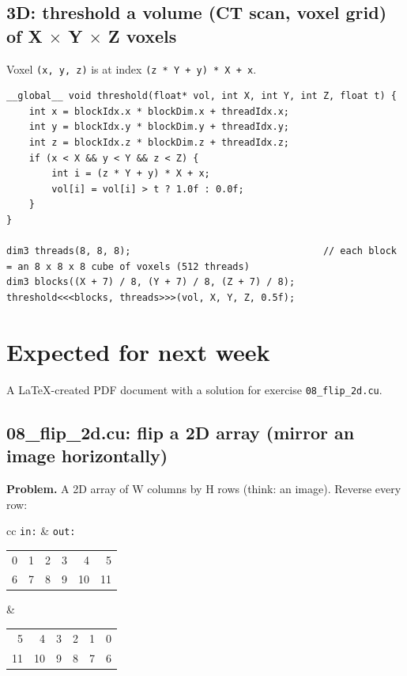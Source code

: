 \documentclass[main.tex]{subfiles}
\begin{document}
\subsection{3D: threshold a volume (CT scan, voxel grid) of X $\times$ Y $\times$ Z voxels}
Voxel \texttt{(x, y, z)} is at index \texttt{(z * Y + y) * X + x}.
\begin{lstlisting}[language=CUDA]
__global__ void threshold(float* vol, int X, int Y, int Z, float t) {
    int x = blockIdx.x * blockDim.x + threadIdx.x;
    int y = blockIdx.y * blockDim.y + threadIdx.y;
    int z = blockIdx.z * blockDim.z + threadIdx.z;
    if (x < X && y < Y && z < Z) {
        int i = (z * Y + y) * X + x;
        vol[i] = vol[i] > t ? 1.0f : 0.0f;
    }
}

dim3 threads(8, 8, 8);                                  // each block = an 8 x 8 x 8 cube of voxels (512 threads)
dim3 blocks((X + 7) / 8, (Y + 7) / 8, (Z + 7) / 8);
threshold<<<blocks, threads>>>(vol, X, Y, Z, 0.5f);
\end{lstlisting}

\section{Expected for next week}

A \LaTeX-created PDF document with a solution for exercise \texttt{08\_flip\_2d.cu}.

\subsection{08\_flip\_2d.cu: flip a 2D array (mirror an image horizontally)}

\textbf{Problem.} A 2D array of W columns by H rows (think: an image). Reverse every row:

\begin{center}
\begin{tabular}{cc}
\texttt{in:} & \texttt{out:}\\
\begin{tabular}{rrrrrr} 0&1&2&3&4&5\\ 6&7&8&9&10&11 \end{tabular} &
\begin{tabular}{rrrrrr} 5&4&3&2&1&0\\ 11&10&9&8&7&6 \end{tabular}
\end{tabular}
\end{center}
\end{document}
